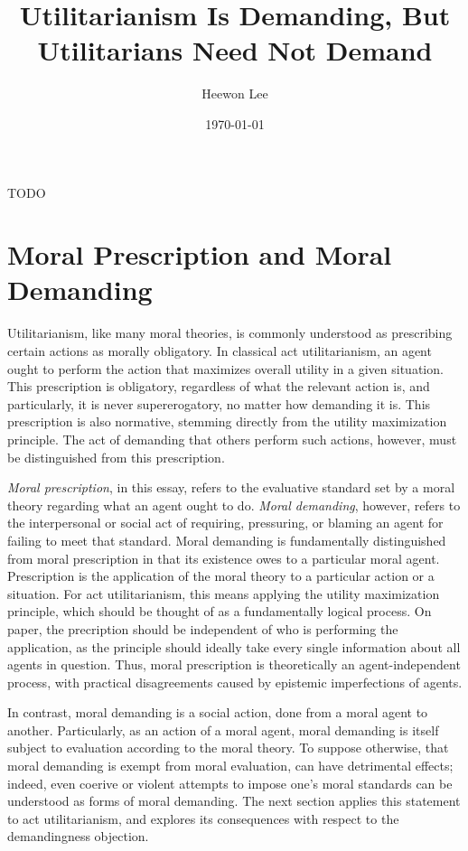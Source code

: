 \documentclass[11pt]{article}
\title{Utilitarianism Is Demanding, But Utilitarians Need Not Demand}
\author{Heewon Lee}
\date{\today}
\begin{document}
\maketitle

TODO \autocite{singer2017famine}

\section{Moral Prescription and Moral Demanding}
Utilitarianism, like many moral theories, is commonly understood as prescribing
certain actions as morally obligatory.
In classical act utilitarianism, an agent ought to perform the action
that maximizes overall utility in a given situation.
This prescription is obligatory, regardless of what the relevant action is,
and particularly, it is never supererogatory, no matter how demanding it is.
This prescription is also normative, stemming directly
from the utility maximization principle.
The act of demanding that others perform such actions, however,
must be distinguished from this prescription.

\emph{Moral prescription}, in this essay, refers to the evaluative standard
set by a moral theory regarding what an agent ought to do.
\emph{Moral demanding}, however, refers to the interpersonal or social act
of requiring, pressuring, or blaming an agent for failing to meet that standard.
Moral demanding is fundamentally distinguished from moral prescription
in that its existence owes to a particular moral agent.
Prescription is the application of the moral theory to a particular action or a situation.
For act utilitarianism, this means applying the utility maximization principle,
which should be thought of as a fundamentally logical process.
On paper, the precription should be independent of who is performing the application,
as the principle should ideally take every single information about all agents in question.
Thus, moral prescription is theoretically an agent-independent process,
with practical disagreements caused by epistemic imperfections of agents.

In contrast, moral demanding is a social action,
done from a moral agent to another.
Particularly, as an action of a moral agent,
moral demanding is itself subject to evaluation according to the moral theory.
To suppose otherwise, that moral demanding is exempt from moral evaluation,
can have detrimental effects;
indeed, even coerive or violent attempts to impose one's moral standards
can be understood as forms of moral demanding.
The next section applies this statement to act utilitarianism,
and explores its consequences with respect to the demandingness objection.
\end{document}
